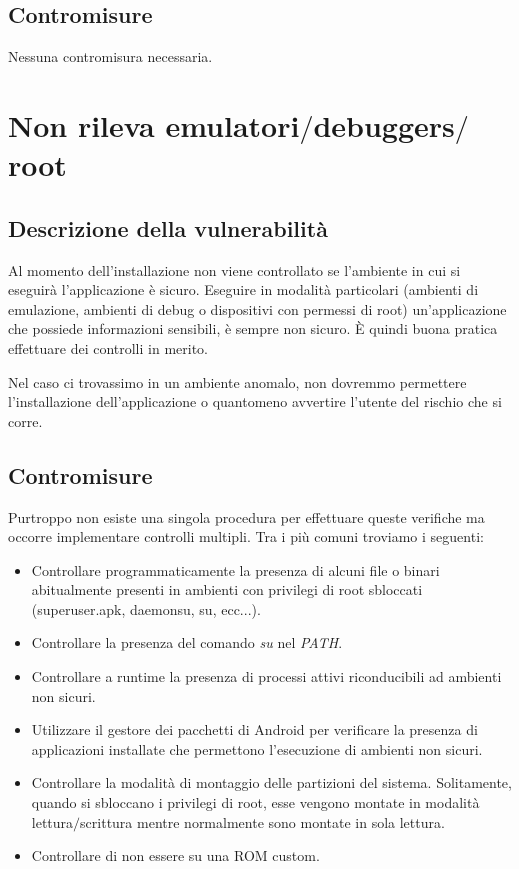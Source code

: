 \subsection{Contromisure}
Nessuna contromisura necessaria.

\section{Non rileva emulatori$/$debuggers$/$root}

\subsection{Descrizione della vulnerabilità}
Al momento dell'installazione non viene controllato se l'ambiente in cui si eseguirà l'applicazione è sicuro. Eseguire in modalità particolari (ambienti di emulazione, ambienti di debug o dispositivi con permessi di root) un'applicazione che possiede informazioni sensibili, è sempre non sicuro. È quindi buona pratica effettuare dei controlli in merito. 

Nel caso ci trovassimo in un ambiente anomalo, non dovremmo permettere l'installazione dell'applicazione o quantomeno avvertire l'utente del rischio che si corre. 

\subsection{Contromisure}
Purtroppo non esiste una singola procedura per effettuare queste verifiche ma occorre implementare controlli multipli. Tra i più comuni troviamo i seguenti:
\begin{itemize}
	\item Controllare programmaticamente la presenza di alcuni file o binari abitualmente presenti in ambienti con privilegi di root sbloccati (superuser.apk, daemonsu, su, ecc...).
	\item Controllare la presenza del comando \emph{su} nel \emph{PATH}.
	\item Controllare a runtime la presenza di processi attivi riconducibili ad ambienti non sicuri.
	\item Utilizzare il gestore dei pacchetti di Android per verificare la presenza di applicazioni installate che permettono l'esecuzione di ambienti non sicuri.
	\item Controllare la modalità di montaggio delle partizioni del sistema. Solitamente, quando si sbloccano i privilegi di root, esse vengono montate in modalità lettura$/$scrittura mentre normalmente sono montate in sola lettura.
	\item Controllare di non essere su una ROM custom. 
\end{itemize} 
